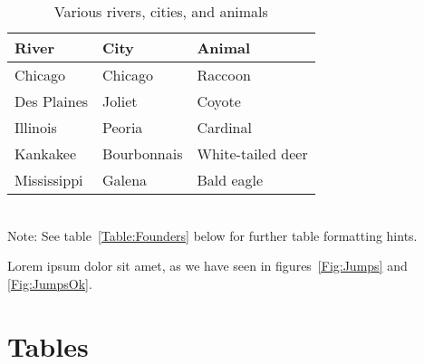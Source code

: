 \documentclass[11pt]{article}
\begin{document}
	\begin{table}[h]
		\caption{Various rivers, cities, and animals}
		\label{Table:Rivers}
		\centering
		\begin{tabular}{lll}\hline
			River        & City        & Animal            \\ \hline
			Chicago      & Chicago     & Raccoon           \\
			Des Plaines  & Joliet      & Coyote            \\
			Illinois     & Peoria      & Cardinal          \\
			Kankakee     & Bourbonnais & White-tailed deer \\
			Mississippi  & Galena      & Bald eagle        \\ \hline
		\end{tabular}
		\bigskip{}
		\\
		{\footnotesize Note: See table~\ref{Table:Founders} below for further table formatting hints.}
	\end{table}
	
	Lorem ipsum dolor sit amet, as we have seen in figures~\ref{Fig:Jumps} and \ref{Fig:JumpsOk}.
	
	


	
	\newpage{}
	
	\section*{Tables}
	\renewcommand{\thetable}{\arabic{table}}
	\setcounter{table}{0}
	
\end{document}
